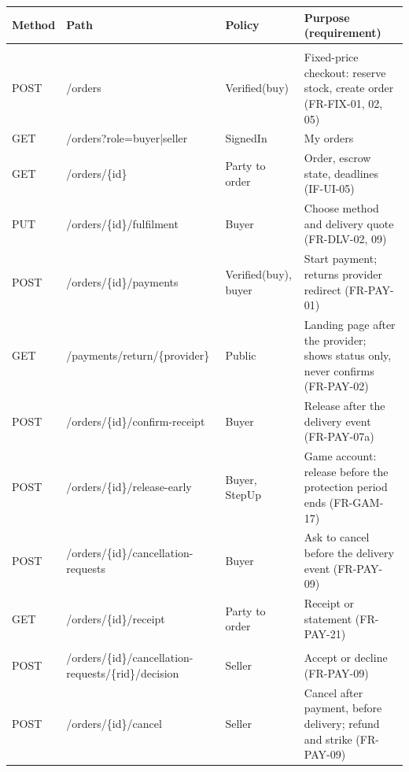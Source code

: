 \documentclass[11pt,a4paper]{article}
\begin{document}
{\small
\begin{longtable}{@{}>{\ttfamily\raggedright\arraybackslash}p{1.15cm}>{\ttfamily\raggedright\arraybackslash}p{4.9cm}>{\raggedright\arraybackslash}p{2.7cm}>{\raggedright\arraybackslash}p{6.2cm}@{}}
\toprule
\textnormal{\textbf{Method}} & \textnormal{\textbf{Path}} & \textbf{Policy} & \textbf{Purpose (requirement)} \\ \midrule \endhead
\multicolumn{4}{@{}l}{\textbf{Buyer}} \\
POST & /\allowbreak orders & Verified(buy) & Fixed-price checkout: reserve stock, create order (FR-FIX-01, 02, 05) \\
GET & /\allowbreak orders?role=buyer|seller & SignedIn & My orders \\
GET & /\allowbreak orders/\allowbreak \{id\} & Party to order & Order, escrow state, deadlines (IF-UI-05) \\
PUT & /\allowbreak orders/\allowbreak \{id\}/\allowbreak fulfilment & Buyer & Choose method and delivery quote (FR-DLV-02, 09) \\
POST & /\allowbreak orders/\allowbreak \{id\}/\allowbreak payments & Verified(buy), buyer & Start payment; returns provider redirect (FR-PAY-01) \\
GET & /\allowbreak payments/\allowbreak return/\allowbreak \{provider\} & Public & Landing page after the provider; shows status only, never confirms (FR-PAY-02) \\
POST & /\allowbreak orders/\allowbreak \{id\}/\allowbreak confirm-\allowbreak receipt & Buyer & Release after the delivery event (FR-PAY-07a) \\
POST & /\allowbreak orders/\allowbreak \{id\}/\allowbreak release-\allowbreak early & Buyer, StepUp & Game account: release before the protection period ends (FR-GAM-17) \\
POST & /\allowbreak orders/\allowbreak \{id\}/\allowbreak cancellation-\allowbreak requests & Buyer & Ask to cancel before the delivery event (FR-PAY-09) \\
GET & /\allowbreak orders/\allowbreak \{id\}/\allowbreak receipt & Party to order & Receipt or statement (FR-PAY-21) \\
\multicolumn{4}{@{}l}{\textbf{Seller}} \\
POST & /\allowbreak orders/\allowbreak \{id\}/\allowbreak cancellation-\allowbreak requests/\allowbreak \{rid\}/\allowbreak decision & Seller & Accept or decline (FR-PAY-09) \\
POST & /\allowbreak orders/\allowbreak \{id\}/\allowbreak cancel & Seller & Cancel after payment, before delivery; refund and strike (FR-PAY-09) \\

\end{longtable}}
\end{document}
